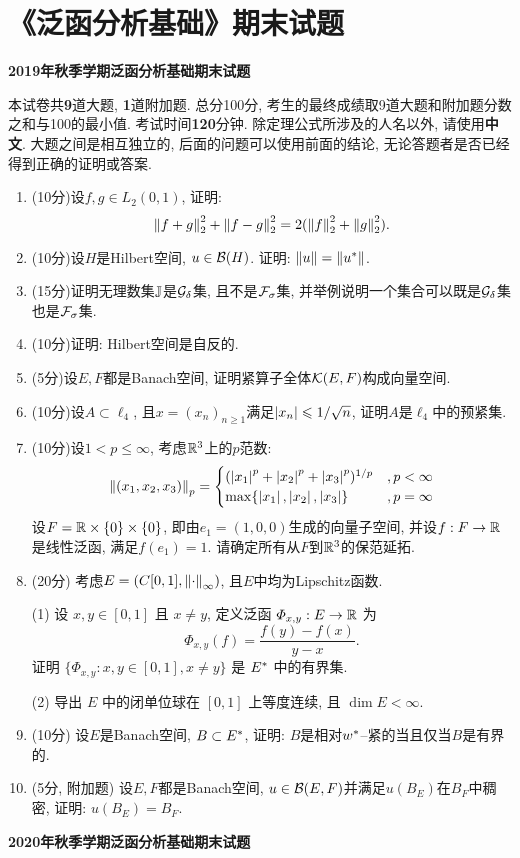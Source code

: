 
\chapter{《泛函分析基础》期末试题}

	\textbf{2019年秋季学期\quad 泛函分析基础\quad 期末试题}

	本试卷共\textbf{9}道大题, \textbf{1}道附加题. 总分100分, 考生的最终成绩取9道大题和附加题分数之和与100的最小值. 考试时间\textbf{120}分钟. 除定理公式所涉及的人名以外, 请使用\textbf{中文}. 大题之间是相互独立的, 后面的问题可以使用前面的结论, 无论答题者是否已经得到正确的证明或答案.

\begin{enumerate}
	\item (10分)设$ f, g\in L_2(0,1) $, 证明:
	\[
	\left\| f+g \right\|_2^2+\left\| f-g \right\|_2^2=2(\left\| f \right\|_2^2+\left\| g \right\|_2^2).
	\]
	\item (10分)设$ H $是Hilbert空间, $ u\in\mathcal{B}(H) $. 证明: $ \left\| u \right\|=\left\| u^{*} \right\| $.
	\item (15分)证明无理数集$ \mathbb{J} $是$ \mathcal{G}_{\delta} $集, 且不是$ \mathcal{F}_{\sigma} $集, 并举例说明一个集合可以既是$ \mathcal{G}_{\delta} $集也是$ \mathcal{F}_{\sigma} $集.
	\item (10分)证明: Hilbert空间是自反的.
	\item (5分)设$ E, F $都是Banach空间, 证明紧算子全体$ \mathcal{K}(E,F) $构成向量空间.
	\item (10分)设$ A\subset\ell_4 $, 且$ x=(x_n)_{n\geqslant 1} $满足$ \left| x_n \right| \leqslant1/\sqrt{n} $, 证明$ A $是$ \ell_4 $中的预紧集.
	\item (10分)设$ 1<p\leqslant \infty $, 考虑$ \mathbb{R}^3 $上的$ p $范数:
	\[
	\left\| (x_1,x_2,x_3) \right\|_p=\begin{cases}
	(\left| x_1 \right| ^p+\left| x_2 \right| ^p+\left| x_3 \right| ^p)^{1/p} & ,p<\infty\\
	\max\{ \left| x_1 \right| ,\left| x_2 \right| ,\left| x_3 \right|  \} &,p=\infty
	\end{cases}
	\]
	设$ F=\mathbb{R}\times\{0\}\times\{0\} $, 即由$ e_1=(1,0,0) $生成的向量子空间, 并设$ f : F\to\mathbb{R} $是线性泛函, 满足$ f(e_1)=1 $. 请确定所有从$ F $到$ \mathbb{R}^3 $的保范延拓.
	\item (20分) 考虑$ E=(C[0,1],\left\| \cdot \right\|_\infty) $, 且$ E $中均为Lipschitz函数.

	\hspace{4em}(1) 设 $ x, y\in[0, 1] $ 且 $ x\ne y $, 定义泛函 $ \varPhi_{x, y}:E\to\mathbb{R} $ 为
		\[
			\varPhi_{x, y}(f)=\frac{f(y)-f(x)}{y-x}.
		\]
	证明 $\{ \varPhi_{x, y}:x, y\in[0, 1], x\ne y \}$ 是 $ E^{*} $ 中的有界集.

	\hspace{4em}(2) 导出 $ E $ 中的闭单位球在 $ [0, 1] $ 上等度连续, 且 $ \dim E<\infty $.
	
	\item (10分) 设$ E $是Banach空间, $ B\subset E^{*} $, 证明: $ B $是相对$ w^{*} $--紧的当且仅当$ B $是有界的.
	\item (5分, 附加题) 设$ E, F $都是Banach空间, $ u\in\mathcal{B}(E,F) $并满足$ u(B_E) $在$ B_F $中稠密, 证明: $ u(B_E)=B_F $.
\end{enumerate}
\newpage
	\textbf{2020年秋季学期\quad 泛函分析基础\quad 期末试题}

